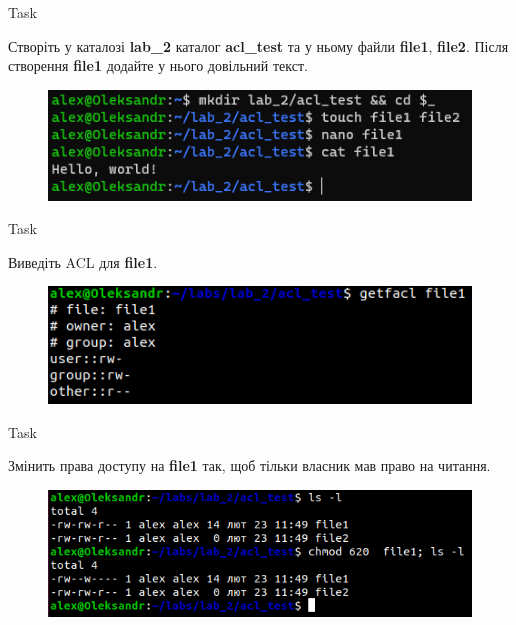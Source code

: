 \documentclass[a4paper,12pt]{article}
\newcommand{\RomanNumeralCaps}[1]{\MakeUppercase{\romannumeral #1}}
\begin{document}
    \begin{center}
        \Large{Task \RomanNumeralCaps{15}}
    \end{center}
    Створіть у каталозі \textbf{lab\_2} каталог \textbf{acl\_test} та у ньому файли \textbf{file1}, \textbf{file2}. Після створення \textbf{file1} додайте у 
    нього довільний текст.
    \begin{figure}[h!]
        \begin{minipage}[h]{1\linewidth}
            \centering
            \includegraphics[width=0.6\linewidth]{Prt sc/Figure_15.png}  
        \end{minipage}
    \end{figure}

    \begin{center}
        \Large{Task \RomanNumeralCaps{16}}
    \end{center}
    Виведіть ACL для \textbf{file1}.
    \begin{figure}[h!]
        \begin{minipage}[h]{1\linewidth}
            \centering
            \includegraphics[width=0.6\linewidth]{Prt sc/Figure_16.png}  
        \end{minipage}
    \end{figure}

    \begin{center}
        \Large{Task \RomanNumeralCaps{17}}
    \end{center}
    Змінить права доступу на \textbf{file1} так, щоб тільки власник мав право на читання.
    \begin{figure}[h!]
        \begin{minipage}[h]{1\linewidth}
            \centering
            \includegraphics[width=0.6\linewidth]{Prt sc/Figure_17.png}  
        \end{minipage}
    \end{figure}
\end{document}
